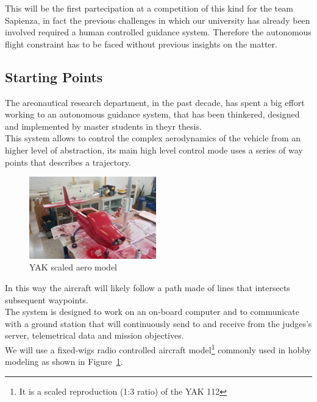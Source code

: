 \documentclass[oneside,onecolumn]{article}
\begin{document}
This will be the first partecipation at a competition of this kind for the team
Sapienza, in fact the previous challenges in which our university has already
been involved required a human controlled guidance system.
Therefore the autonomous flight constraint has to be faced without previous
insights on the matter.
\newpage

\subsection{Starting Points}
The areonautical research department, in the past decade, has spent a big
effort working to an autonomous guidance system, that has been thinkered,
designed and implemented by master students in theyr thesis.\\
This system allows to control the complex aerodynamics of the vehicle from an
higher level of abstraction, its main high level control mode uses a series of
way points that describes a trajectory.\\
\bigskip
\begin{figure}
\caption{YAK scaled aero model}\label{wrap-fig:1}
\includegraphics[width=5.5cm]{YAK1}
\end{figure} 

In this way the aircraft will likely follow a path made of lines that intersects subsequent waypoints.\\
The system is designed to work on an on-board computer and to communicate with a
ground station that will continuously send to and receive from the judges's
server, telemetrical data and mission objectives.\\


We will use a fixed-wigs radio controlled aircraft model\footnote{It is a scaled
  reproduction (1:3 ratio) of the YAK 112} commonly used in hobby
modeling as shown in Figure~\ref{wrap-fig:1}.
\end{document}
